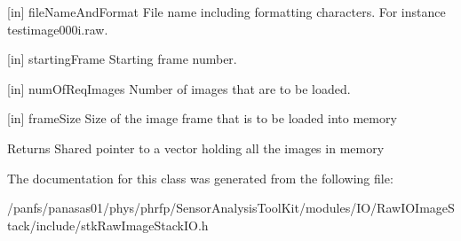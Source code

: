 \begin{DoxyParagraph}{\mbox{[}in\mbox{]} fileNameAndFormat File name including formatting characters. For instance testimage000i.raw.}

\end{DoxyParagraph}
\begin{DoxyParagraph}{\mbox{[}in\mbox{]} startingFrame Starting frame number.}

\end{DoxyParagraph}
\begin{DoxyParagraph}{\mbox{[}in\mbox{]} numOfReqImages Number of images that are to be loaded.}

\end{DoxyParagraph}
\begin{DoxyParagraph}{\mbox{[}in\mbox{]} frameSize Size of the image frame that is to be loaded into memory}

\end{DoxyParagraph}
\begin{DoxyReturn}{Returns}
Shared pointer to a vector holding all the images in memory 
\end{DoxyReturn}


The documentation for this class was generated from the following file:\begin{DoxyCompactItemize}
\item 
/panfs/panasas01/phys/phrfp/SensorAnalysisToolKit/modules/IO/RawIOImageStack/include/stkRawImageStackIO.h\end{DoxyCompactItemize}
